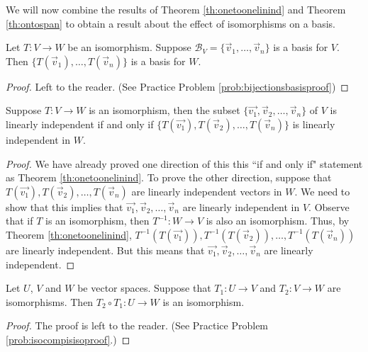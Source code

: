 \documentclass{ximera}
\begin{document}
We will now combine the results of Theorem \ref{th:onetoonelinind} and Theorem \ref{th:ontospan} to obtain a result about the effect of isomorphisms on a basis.

\begin{theorem}\label{th:bijectionsbasis}
Let $T:V\rightarrow W$ be an isomorphism.  Suppose $\mathcal{B}_V=\{\vec{v}_1,\ldots ,\vec{v}_n\}$ is a basis for $V$.  Then $\{T(\vec{v}_1),\ldots ,T(\vec{v}_n)\}$ is a basis for $W$.
\end{theorem}
\begin{proof}
Left to the reader.  (See Practice Problem \ref{prob:bijectionsbasisproof}) 
\end{proof}

\begin{theorem}\label{th:linindtolinindiso}
Suppose $T:V\rightarrow W$ is an isomorphism, then the subset $\{\vec{v_1}, \vec{v}_2,\ldots ,\vec{v}_n\}$ of $V$ is linearly independent if and only if $\{T(\vec{v_1}), T(\vec{v}_2),\ldots ,T(\vec{v}_n)\}$ is linearly independent in $W$.
\end{theorem} 
\begin{proof}
We have already proved one direction of this this ``if and only if" statement as Theorem \ref{th:onetoonelinind}.  To prove the other direction, suppose that $T(\vec{v_1}), T(\vec{v}_2),\ldots ,T(\vec{v}_n)$ are linearly independent vectors in $W$.  We need to show that this implies that $\vec{v_1}, \vec{v}_2,\ldots ,\vec{v}_n$ are linearly independent in $V$.  Observe that if $T$ is an isomorphism, then $T^{-1}:W\rightarrow V$ is also an isomorphism.  Thus, by Theorem \ref{th:onetoonelinind}, $T^{-1}(T(\vec{v_1})), T^{-1}(T(\vec{v}_2)),\ldots ,T^{-1}(T(\vec{v}_n))$ are linearly independent.  But this means that $\vec{v_1}, \vec{v}_2,\ldots ,\vec{v}_n$ are linearly independent.
\end{proof}

\begin{theorem}\label{th:isocompisiso}
Let $U$, $V$ and $W$ be vector spaces.  Suppose that $T_1:U\rightarrow V$ and $T_2:V\rightarrow W$ are isomorphisms.  Then $T_2\circ T_1:U\rightarrow W$ is an isomorphism.
\end{theorem}
\begin{proof}
The proof is left to the reader.  (See Practice Problem \ref{prob:isocompisisoproof}.)
\end{proof}
 
\end{document}
